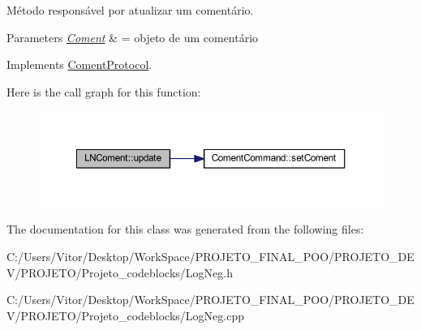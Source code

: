 Método responsável por atualizar um comentário. 


\begin{DoxyParams}{Parameters}
{\em \hyperlink{class_coment}{Coment}} & = objeto de um comentário \\
\hline
\end{DoxyParams}


Implements \hyperlink{class_coment_protocol}{Coment\-Protocol}.



Here is the call graph for this function\-:\nopagebreak
\begin{figure}[H]
\begin{center}
\leavevmode
\includegraphics[width=350pt]{class_l_n_coment_acefe80ac606f9258093f22eca0759cb0_cgraph}
\end{center}
\end{figure}




The documentation for this class was generated from the following files\-:\begin{DoxyCompactItemize}
\item 
C\-:/\-Users/\-Vitor/\-Desktop/\-Work\-Space/\-P\-R\-O\-J\-E\-T\-O\-\_\-\-F\-I\-N\-A\-L\-\_\-\-P\-O\-O/\-P\-R\-O\-J\-E\-T\-O\-\_\-\-D\-E\-V/\-P\-R\-O\-J\-E\-T\-O/\-Projeto\-\_\-codeblocks/Log\-Neg.\-h\item 
C\-:/\-Users/\-Vitor/\-Desktop/\-Work\-Space/\-P\-R\-O\-J\-E\-T\-O\-\_\-\-F\-I\-N\-A\-L\-\_\-\-P\-O\-O/\-P\-R\-O\-J\-E\-T\-O\-\_\-\-D\-E\-V/\-P\-R\-O\-J\-E\-T\-O/\-Projeto\-\_\-codeblocks/Log\-Neg.\-cpp\end{DoxyCompactItemize}
